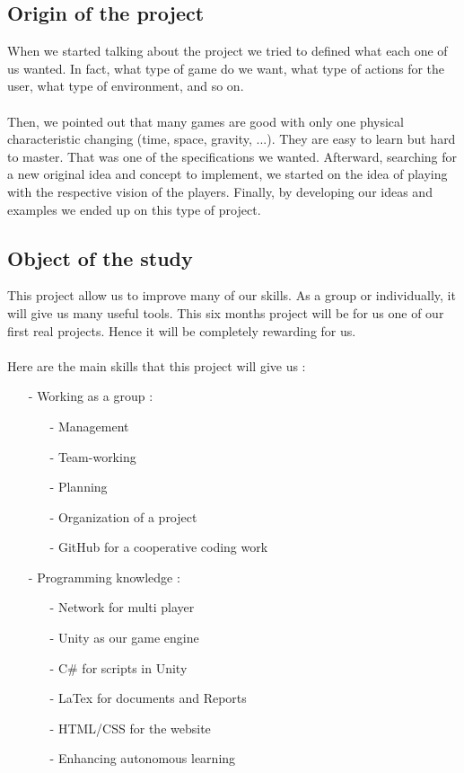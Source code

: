 \documentclass[12pt]{article}
\begin{document}
	\subsection{Origin of the project}
		When we started talking about the project we tried to defined what each one of us wanted. In fact, what type of game do we want, what type of actions for the user, what type of environment, and so on.
        
 		\paragraph*{}Then, we pointed out that many games are good with only one physical characteristic changing (time, space, gravity, ...). They are easy to learn but hard to master. That was one of the specifications we wanted. Afterward, searching for a new original idea and concept to implement, we started on the idea of playing with the respective vision of the players. Finally, by developing our ideas and examples we ended up on this type of project.
		
        
	\subsection{Object of the study}
    	This project allow us to improve many of our skills. As a group or individually, it will give us many useful tools. This six months project will be for us one of our first real projects. Hence it will be completely rewarding for us.
        \paragraph*{}Here are the main skills that this project will give us :
        \begin{itemize}
        \item[-] Working as a group :
         	\begin{itemize}
                \item[-] Management
                \item[-] Team-working
                \item[-] Planning
                \item[-] Organization of a project
                \item[-] GitHub for a cooperative coding work
            \end{itemize}
        \item[-] Programming knowledge :
        	\begin{itemize}
            	\item[-] Network for multi player
                \item[-] Unity as our game engine
                \item[-] C\# for scripts in Unity
                \item[-] LaTex for documents and Reports
                \item[-] HTML/CSS for the website
                \item[-] Enhancing autonomous learning
            \end{itemize}
        \end{itemize}
         
\end{document}
